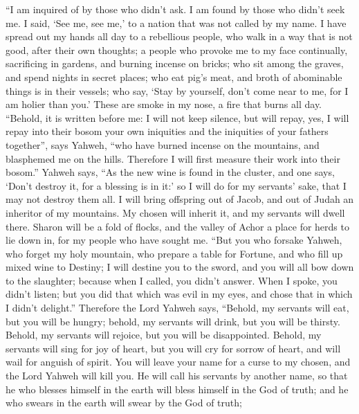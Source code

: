  ``I am inquired of by those who didn't ask. I am found by
those who didn't seek me. I said, `See me, see me,' to a nation that was
not called by my name.  I have spread out my hands all day
to a rebellious people, who walk in a way that is not good, after their
own thoughts;  a people who provoke me to my face
continually, sacrificing in gardens, and burning incense on bricks;
 who sit among the graves, and spend nights in secret
places; who eat pig's meat, and broth of abominable things is in their
vessels;  who say, `Stay by yourself, don't come near to me,
for I am holier than you.' These are smoke in my nose, a fire that burns
all day.  ``Behold, it is written before me: I will not keep
silence, but will repay, yes, I will repay into their bosom 
your own iniquities and the iniquities of your fathers together'', says
Yahweh, ``who have burned incense on the mountains, and blasphemed me on
the hills. Therefore I will first measure their work into their bosom.''
 Yahweh says, ``As the new wine is found in the cluster, and
one says, `Don't destroy it, for a blessing is in it:' so I will do for
my servants' sake, that I may not destroy them all.  I will
bring offspring out of Jacob, and out of Judah an inheritor of my
mountains. My chosen will inherit it, and my servants will dwell there.
 Sharon will be a fold of flocks, and the valley of Achor a
place for herds to lie down in, for my people who have sought me.
 ``But you who forsake Yahweh, who forget my holy mountain,
who prepare a table for Fortune, and who fill up mixed wine to Destiny;
 I will destine you to the sword, and you will all bow down
to the slaughter; because when I called, you didn't answer. When I
spoke, you didn't listen; but you did that which was evil in my eyes,
and chose that in which I didn't delight.''  Therefore the
Lord Yahweh says, ``Behold, my servants will eat, but you will be
hungry; behold, my servants will drink, but you will be thirsty. Behold,
my servants will rejoice, but you will be disappointed. 
Behold, my servants will sing for joy of heart, but you will cry for
sorrow of heart, and will wail for anguish of spirit.  You
will leave your name for a curse to my chosen, and the Lord Yahweh will
kill you. He will call his servants by another name,  so
that he who blesses himself in the earth will bless himself in the God
of truth; and he who swears in the earth will swear by the God of truth;
